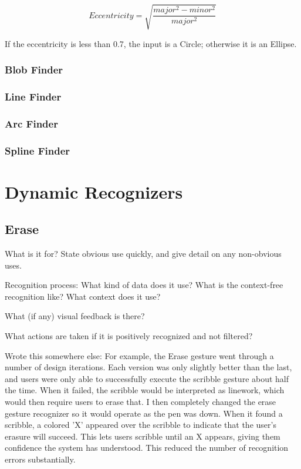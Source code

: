 \begin{samepage}
\begin{samepage}
\begin{equation}
Eccentricity = \sqrt{\dfrac{major^2-minor^2}{major^2}}
\end{equation}

If the eccentricity is less than 0.7, the input is a Circle; otherwise
it is an Ellipse.

\subsubsection{Blob Finder}

\subsubsection{Line Finder}

\subsubsection{Arc Finder}

\subsubsection{Spline Finder}

\section{Dynamic Recognizers}

\subsection{Erase}

What is it for? State obvious use quickly, and give detail on any
non-obvious uses.

Recognition process: What kind of data does it use? What is the
context-free recognition like? What context does it use?

What (if any) visual feedback is there?

What actions are taken if it is positively recognized and not
filtered?

Wrote this somewhere else: For example, the Erase gesture went through
a number of design iterations. Each version was only slightly better
than the last, and users were only able to successfully execute the
scribble gesture about half the time. When it failed, the scribble
would be interpreted as linework, which would then require users to
erase that. I then completely changed the erase gesture recognizer so
it would operate as the pen was down. When it found a scribble, a
colored 'X' appeared over the scribble to indicate that the user's
erasure will succeed. This lets users scribble until an X appears,
giving them confidence the system has understood. This reduced the
number of recognition errors substantially.


\end{samepage}
\end{samepage}
